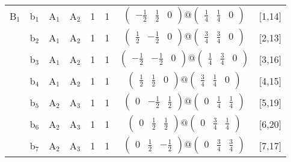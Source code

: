 \documentclass[fleqn,10pt,landscape]{article}
\begin{document}
\begin{itemize}
\begin{center}
\begin{longtable}{cc|cc|c|c|c|l}
B$_{1}$ & b$_{1}$ & A$_{1}$ & A$_{2}$ & 1 & 1 & $\begin{pmatrix} - \frac{1}{2} & \frac{1}{2} & 0 \end{pmatrix}@\begin{pmatrix} \frac{1}{4} & \frac{1}{4} & 0 \end{pmatrix}$ & [1,14] \\
& b$_{2}$ & A$_{1}$ & A$_{2}$ & 1 & 1 & $\begin{pmatrix} \frac{1}{2} & - \frac{1}{2} & 0 \end{pmatrix}@\begin{pmatrix} \frac{3}{4} & \frac{3}{4} & 0 \end{pmatrix}$ & [2,13] \\
& b$_{3}$ & A$_{1}$ & A$_{2}$ & 1 & 1 & $\begin{pmatrix} - \frac{1}{2} & - \frac{1}{2} & 0 \end{pmatrix}@\begin{pmatrix} \frac{1}{4} & \frac{3}{4} & 0 \end{pmatrix}$ & [3,16] \\
& b$_{4}$ & A$_{1}$ & A$_{2}$ & 1 & 1 & $\begin{pmatrix} \frac{1}{2} & \frac{1}{2} & 0 \end{pmatrix}@\begin{pmatrix} \frac{3}{4} & \frac{1}{4} & 0 \end{pmatrix}$ & [4,15] \\
& b$_{5}$ & A$_{2}$ & A$_{3}$ & 1 & 1 & $\begin{pmatrix} 0 & - \frac{1}{2} & \frac{1}{2} \end{pmatrix}@\begin{pmatrix} 0 & \frac{1}{4} & \frac{1}{4} \end{pmatrix}$ & [5,19] \\
& b$_{6}$ & A$_{2}$ & A$_{3}$ & 1 & 1 & $\begin{pmatrix} 0 & \frac{1}{2} & \frac{1}{2} \end{pmatrix}@\begin{pmatrix} 0 & \frac{3}{4} & \frac{1}{4} \end{pmatrix}$ & [6,20] \\
& b$_{7}$ & A$_{2}$ & A$_{3}$ & 1 & 1 & $\begin{pmatrix} 0 & \frac{1}{2} & - \frac{1}{2} \end{pmatrix}@\begin{pmatrix} 0 & \frac{3}{4} & \frac{3}{4} \end{pmatrix}$ & [7,17] \\

\end{longtable}
\end{center}
\end{itemize}
\end{document}
